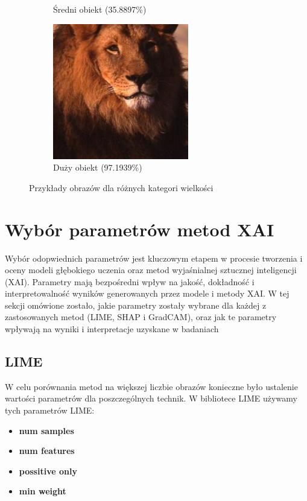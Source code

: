 \begin{figure}
\begin{subfigure}[b]{0.3\textwidth}
		\caption{Średni obiekt (35.8897\%)}  \label{}
	\end{subfigure}
	\begin{subfigure}[b]{0.3\textwidth}
		\centering\includegraphics[width=.9\textwidth]{img/examples/size_category_big}
		\caption{Duży obiekt (97.1939\%)}  \label{}
	\end{subfigure}
	\caption{Przykłady obrazów dla różnych kategori wielkości}
\end{figure}

\section*{Wybór parametrów metod XAI}
Wybór odopwiednich parametrów jest kluczowym etapem w procesie tworzenia i oceny modeli głębokiego uczenia oraz metod wyjaśnialnej sztucznej inteligencji (XAI).
Parametry mają bezpośredni wpływ na jakość, dokładność i interpretowalność wyników generowanych przez modele i metody XAI.
W tej sekcji omówione zostało, jakie parametry zostały wybrane dla każdej z zastosowanych metod (LIME, SHAP i GradCAM), oraz jak te parametry wpływają na wyniki i interpretacje uzyskane w badaniach

\subsection*{LIME}
W celu porównania metod na większej liczbie obrazów konieczne było ustalenie wartości parametrów dla poszczególnych technik.
W bibliotece LIME używamy tych parametrów LIME:
\begin{itemize}
	\item \textbf{num samples}
	\item \textbf{num features}
	\item \textbf{possitive only}
	\item \textbf{min weight}
\end{itemize}

